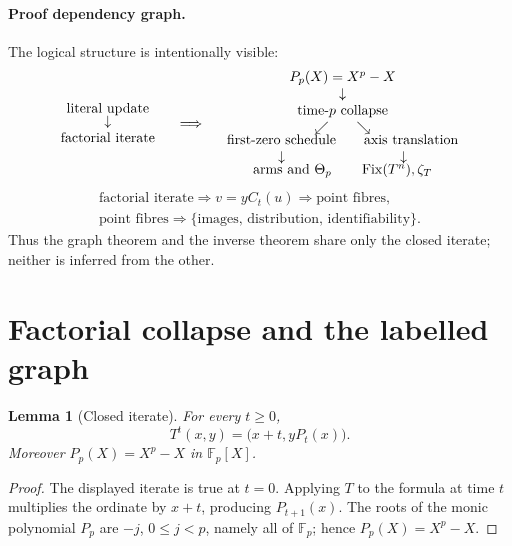 \documentclass[10pt,a4paper]{amsart}
\newtheorem{lemma}[theorem]{Lemma}
\theoremstyle{remark}
\newcommand{\F}{\mathbb F}
\newcommand{\Fix}{\operatorname{Fix}}
\begin{document}
\paragraph{Proof dependency graph.}
The logical structure is intentionally visible:
\[
\begin{array}{c}
\text{literal update}\\[-1mm]
\downarrow\\
\text{factorial iterate}
\end{array}
\quad\Longrightarrow\quad
\begin{array}{c}
P_p(X)=X^p-X\\
\downarrow\\
\text{time-\(p\) collapse}\\
\swarrow\qquad\searrow\\[-1mm]
\text{first-zero schedule}\qquad\text{axis translation}\\
\downarrow\hspace{29mm}\downarrow\\[-1mm]
\text{arms and }\Theta_p\qquad \Fix(T^n),\zeta_T
\end{array}
\]
\[
\begin{gathered}
\text{factorial iterate}\Longrightarrow v=yC_t(u)
\Longrightarrow\text{point fibres},\\
\text{point fibres}\Longrightarrow
\{\text{images, distribution, identifiability}\}.
\end{gathered}
\tag{4}\label{eq:dependency}
\]
Thus the graph theorem and the inverse theorem share only the closed iterate;
neither is inferred from the other.

\section{Factorial collapse and the labelled graph}

\begin{lemma}[Closed iterate]\label{lem:iterate}
For every \(t\geq0\),
\[
T^t(x,y)=\bigl(x+t,yP_t(x)\bigr).
\]
Moreover \(P_p(X)=X^p-X\) in \(\F_p[X]\).
\end{lemma}

\begin{proof}
The displayed iterate is true at \(t=0\).  Applying \(T\) to the formula at
time \(t\) multiplies the ordinate by \(x+t\), producing \(P_{t+1}(x)\).
The roots of the monic polynomial \(P_p\) are
\(-j\), \(0\leq j<p\), namely all of \(\F_p\); hence
\(P_p(X)=X^p-X\).
\end{proof}
\end{document}
